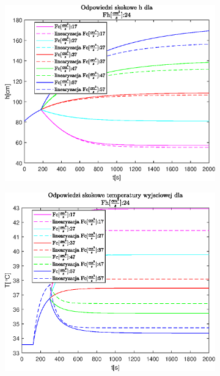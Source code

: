 \begin{figure}[h!]
   \centering
   \begin{subfigure}[b]{0.6\textwidth}
      \includegraphics[width=1\linewidth]{img/step-responses/stepResponseHFh24.eps}
      \caption{}
      \label{fig:fig:stepResponsesFh241}
   \end{subfigure}
       
   \begin{subfigure}[b]{0.6\textwidth}
      \includegraphics[width=1\linewidth]{img/step-responses/stepResponseToutFh24.eps}
      \caption{}
      \label{fig:fig:stepResponsesFh242}
   \end{subfigure}
       

\end{figure}
